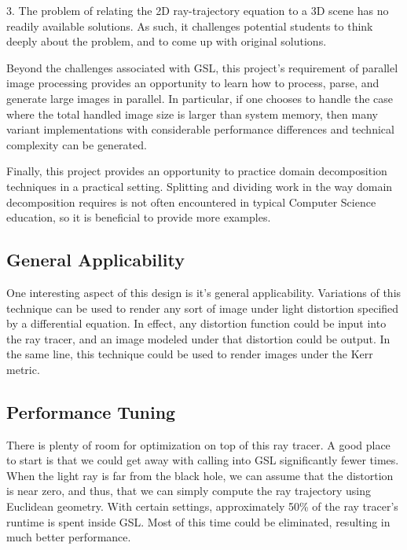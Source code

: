 3. The problem of relating the 2D ray-trajectory equation to a 3D scene has no readily available solutions. As such, it challenges potential students to think deeply about the problem, and to come up with original solutions.

Beyond the challenges associated with GSL, this project's requirement of parallel image processing provides an opportunity to learn how to process, parse, and generate large images in parallel. In particular, if one chooses to handle the case where the total handled image size is larger than system memory, then many variant implementations with considerable performance differences and technical complexity can be generated. 

Finally, this project provides an opportunity to practice domain decomposition techniques in a practical setting. Splitting and dividing work in the way domain decomposition requires is not often encountered in typical Computer Science education, so it is beneficial to provide more examples.


\subsection{General Applicability}
One interesting aspect of this design is it's general applicability. Variations of this technique can be used to render any sort of image under light distortion specified by a differential equation. In effect, any distortion function could be input into the ray tracer, and an image modeled under that distortion could be output. In the same line, this technique could be used to render images under the Kerr metric.


\subsection{Performance Tuning}
There is plenty of room for optimization on top of this ray tracer. A good place to start is that we could get away with calling into GSL significantly fewer times. When the light ray is far from the black hole, we can assume that the distortion is near zero, and thus, that we can simply compute the ray trajectory using Euclidean geometry. With certain settings, approximately 50\% of the ray tracer's runtime is spent inside GSL. Most of this time could be eliminated, resulting in much better performance. 


